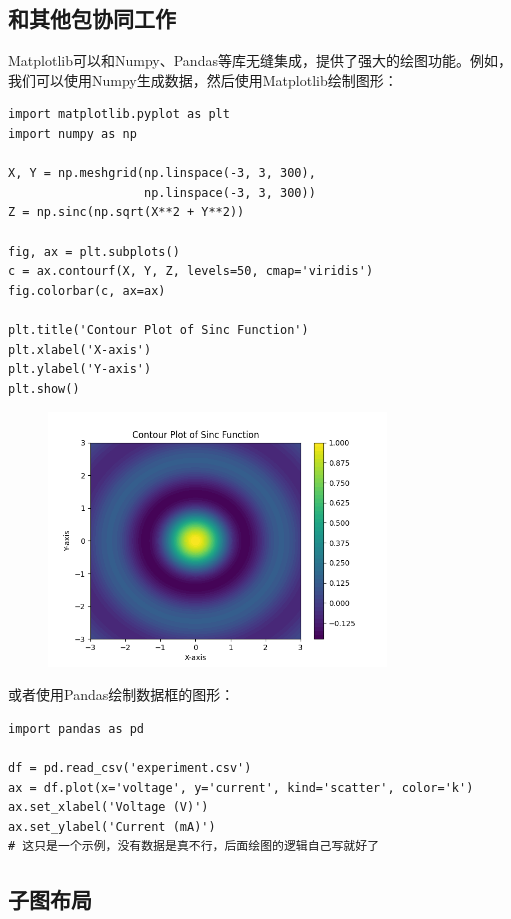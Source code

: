 \documentclass[../main.tex]{subfiles}
\begin{document}
\subsection{和其他包协同工作}

Matplotlib可以和Numpy、Pandas等库无缝集成，提供了强大的绘图功能。例如，我们可以使用Numpy生成数据，然后使用Matplotlib绘制图形：
\begin{lstlisting}
import matplotlib.pyplot as plt
import numpy as np

X, Y = np.meshgrid(np.linspace(-3, 3, 300),
                   np.linspace(-3, 3, 300))
Z = np.sinc(np.sqrt(X**2 + Y**2))

fig, ax = plt.subplots()
c = ax.contourf(X, Y, Z, levels=50, cmap='viridis')
fig.colorbar(c, ax=ax)

plt.title('Contour Plot of Sinc Function')
plt.xlabel('X-axis')
plt.ylabel('Y-axis')
plt.show()
\end{lstlisting}

\begin{figure}
    \centering
    \includegraphics[width=0.8\textwidth]{images/plt/Figure_3.png}
\end{figure}

或者使用Pandas绘制数据框的图形：
\begin{lstlisting}
import pandas as pd

df = pd.read_csv('experiment.csv')
ax = df.plot(x='voltage', y='current', kind='scatter', color='k')
ax.set_xlabel('Voltage (V)')
ax.set_ylabel('Current (mA)')
# 这只是一个示例，没有数据是真不行，后面绘图的逻辑自己写就好了
\end{lstlisting}

\subsection{子图布局}
\end{document}
